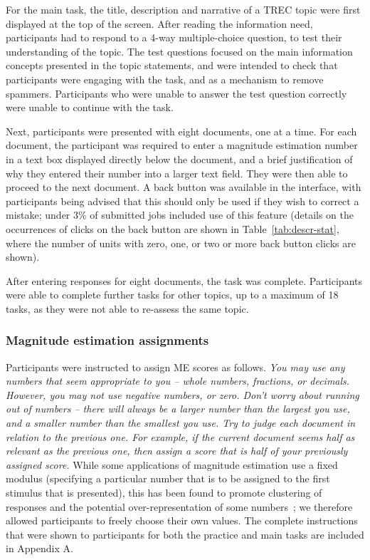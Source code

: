 For the main task, the title, description and narrative of a TREC topic
were first displayed at the top of the screen.
After reading the information need, participants had to respond to a
4-way multiple-choice question, to test their understanding of the
topic.
The test questions focused on the main information concepts presented
in the topic statements, and were intended to check that participants
were engaging with the task, and as a mechanism to remove spammers.
Participants who were unable to answer the test question correctly were
unable to continue with the task.

Next, participants were presented with eight documents, one at a time.
For each document, the participant was required to enter a magnitude estimation 
number in a text box displayed directly below the document, and 
a brief justification of why they
entered their number into a larger text field.
They were then able to proceed to the next document.
A back button was available in the interface, with participants being
advised that this should only be used if they wish to correct a mistake;
under 3\% of submitted jobs included use of this feature 
(details on the occurrences of clicks on the back button are shown in
Table~\ref{tab:descr-stat}, where the number of units with zero, one, or two
or more back button clicks are shown).

After entering responses for eight documents, the task was complete.
Participants were able to complete further tasks for other topics, up
to a maximum of 18 tasks, as they were not able to re-assess the same
topic.

\subsubsection{Magnitude estimation assignments}
\label{sec:magn-estim-assignm}

Participants were instructed 
to assign ME scores as follows.
\emph{You may use any numbers that seem appropriate to you -- whole numbers,
fractions, or decimals.
However, you may not use negative numbers, or zero.
Don't worry about running out of numbers -- there will always be a
larger number than the largest you use, and a smaller number than the
smallest you use.
Try to judge each document in relation to the previous one.
For example, if the current document seems half as relevant as the
previous one, then assign a score that is half of your previously
assigned score.} 
While some applications of
magnitude estimation use a fixed modulus (specifying a particular number that
is to be assigned to the first stimulus that is presented), this has
been found to promote clustering of responses and the potential
over-representation of some numbers~\cite{moskowitz:1977}; we therefore
allowed participants to freely choose their own values.
The complete
instructions that were shown to participants for both the practice and
main tasks are included in Appendix A.

